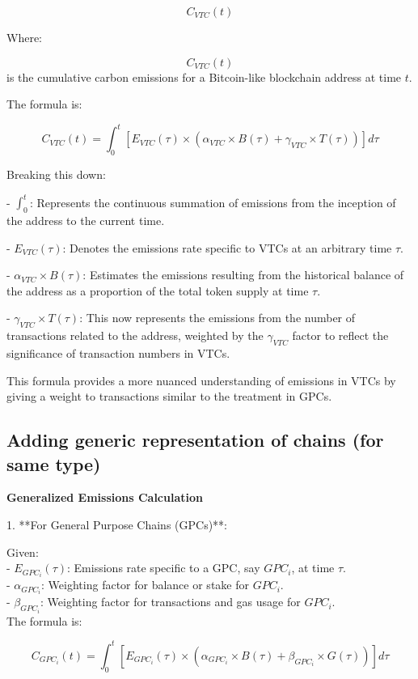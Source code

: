 \documentclass[12pt]{article}
\begin{document}
\[ C_{VTC}(t) \]

Where:

\[ C_{VTC}(t) \] is the cumulative carbon emissions for a Bitcoin-like blockchain address at time \( t \).

The formula is:

\[ C_{VTC}(t) = \int_{0}^{t} [E_{VTC}(\tau) \times (\alpha_{VTC} \times B(\tau) + \gamma_{VTC} \times T(\tau))] d\tau \]

Breaking this down:

- \( \int_{0}^{t} \): Represents the continuous summation of emissions from the inception of the address to the current time.
  
- \( E_{VTC}(\tau) \): Denotes the emissions rate specific to VTCs at an arbitrary time \( \tau \).
  
- \( \alpha_{VTC} \times B(\tau) \): Estimates the emissions resulting from the historical balance of the address as a proportion of the total token supply at time \( \tau \).
  
- \( \gamma_{VTC} \times T(\tau) \): This now represents the emissions from the number of transactions related to the address, weighted by the \( \gamma_{VTC} \) factor to reflect the significance of transaction numbers in VTCs.

This formula provides a more nuanced understanding of emissions in VTCs by giving a weight to transactions similar to the treatment in GPCs.

\subsection{Adding generic representation of chains (for same type)}

\textbf{Generalized Emissions Calculation}

1. **For General Purpose Chains (GPCs)**:

Given: \\
- \( E_{GPC_i}(\tau) \): Emissions rate specific to a GPC, say \( GPC_i \), at time \( \tau \). \\
- \( \alpha_{GPC_i} \): Weighting factor for balance or stake for \( GPC_i \). \\
- \( \beta_{GPC_i} \): Weighting factor for transactions and gas usage for \( GPC_i \). \\

The formula is:

\[ C_{GPC_i}(t) = \int_{0}^{t} [E_{GPC_i}(\tau) \times (\alpha_{GPC_i} \times B(\tau) + \beta_{GPC_i} \times G(\tau))] d\tau \]
\end{document}
